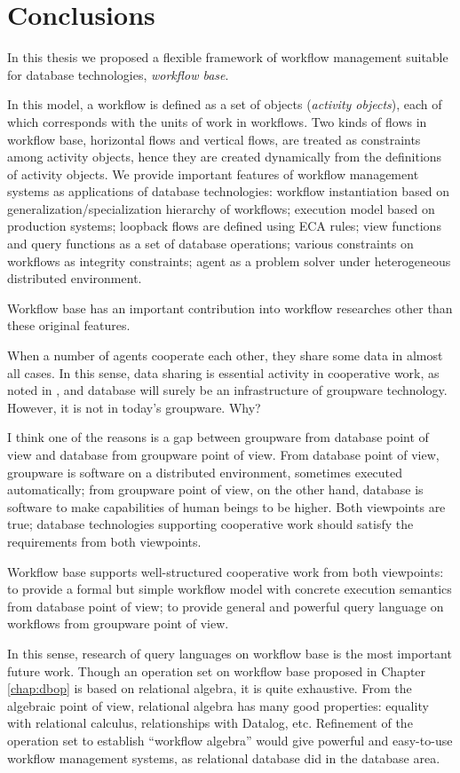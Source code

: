 
\chapter{Conclusions}
\label{chap:conclusion}

In this thesis we proposed a flexible framework of workflow management
suitable for database technologies, {\em workflow base}.  

In this model, a workflow is defined as a set of objects (\emph{activity
objects}), each of which corresponds with the units of work in
workflows.  Two kinds of flows in workflow base, horizontal flows and
vertical flows, are treated as constraints among activity objects, hence
they are created dynamically from the definitions of activity objects.
We provide important features of workflow management systems as
applications of database technologies: workflow instantiation based on
generalization/specialization hierarchy of workflows; execution model
based on production systems; loopback flows are defined using ECA rules;
view functions and query functions as a set of database operations;
various constraints on workflows as integrity constraints; agent as a
problem solver under heterogeneous distributed environment.

Workflow base has an important contribution into workflow researches
other than these original features.

When a number of agents cooperate each other, they share some data in
almost all cases.  In this sense, data sharing is essential activity in
cooperative work, as noted in \cite{greif:toois87}, and database will
surely be an infrastructure of groupware technology.
However, it is not in today's groupware.  Why?

I think one of the reasons is a gap between groupware from database
point of view and database from groupware point of view.  From database
point of view, groupware is software on a distributed environment,
sometimes executed automatically; from groupware point of view, on the
other hand, database is software to make capabilities of human beings to
be higher.  Both viewpoints are true; database technologies supporting
cooperative work should satisfy the requirements from both viewpoints.

Workflow base supports well-structured cooperative work from both
viewpoints: to provide a formal but simple workflow model with concrete
execution semantics from database point of view; to provide general and
powerful query language on workflows from groupware point of view.

In this sense, research of query languages on workflow base is the most
important future work.  Though an operation set on workflow base
proposed in Chapter \ref{chap:dbop} is based on relational algebra, it
is quite exhaustive.  From the algebraic point of view, relational
algebra has many good properties: equality with relational calculus,
relationships with Datalog, etc.  Refinement of the operation set to
establish ``workflow algebra'' would give powerful and easy-to-use
workflow management systems, as relational database did in the database
area.
